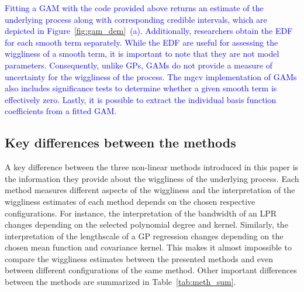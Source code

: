 \documentclass[man, floatsintext]{apa7}
\begin{document}
\textcolor{blue}{
  Fitting a GAM with the code provided above returns an estimate of the
  underlying process along with corresponding credible intervals,
  which are depicted in Figure~\ref{fig:gam_dem}~(a). Additionally,
  researchers obtain the EDF for each smooth term separately. While the EDF are
  useful for assessing the wiggliness of a smooth term, it is important to note
  that they are not model parameters. Consequently, unlike GPs, GAMs do not
  provide a measure of uncertainty for the wiggliness of the process. The mgcv
  implementation of GAMs also includes significance tests to determine whether
  a given smooth term is effectively zero. Lastly, it is possible to extract
  the individual basis function coefficients from a fitted GAM.}

\subsection{Key differences between the methods}

A key difference between the three non-linear methods introduced in this paper
is the information they provide about the wiggliness of the underlying process.
Each method measures different aspects of the wiggliness and the interpretation
of the wiggliness estimates of each method depends on the chosen respective
configurations. For instance, the interpretation of the bandwidth of an LPR
changes depending on the selected polynomial degree and kernel. Similarly, the
interpretation of the lengthscale of a GP regression changes depending on the
chosen mean function and covariance kernel. This makes it almost impossible to
compare the wiggliness estimates between the presented methods and even between
different configurations of the same method. Other important differences
between the methods are summarized in Table~\ref{tab:meth_sum}.
\end{document}
